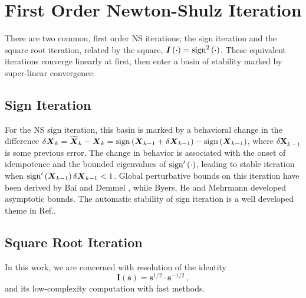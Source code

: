 \documentclass[letterpaper,twocolumn,amsmath,amsfont,amssymb,english,aps,jcp,preprintnumbers,groupaddress,nofootinbib,tightenlines,floatfix]{revtex4}
\newcommand{\mat}[1]{\boldsymbol{#1}}
\theoremstyle{plain}
\theoremstyle{remark}
\theoremstyle{plain}
\begin{document}

\section{First Order Newton-Shulz Iteration}

There are two common, first order NS iterations; the sign iteration
and the square root iteration, related by the square, $\mat{I}\left(
\cdot \right)= {\rm sign}^2\left( \cdot \right) $.  These equivalent
iterations converge linearly at first, then enter a basin of stability
marked by super-linear convergence.  

\subsection{Sign Iteration}

For the NS sign iteration, this basin is marked by a behavioral change
in the difference $\delta \mat{X}_k = \widetilde{\mat{X}}_k -\mat{X}_k
= {\rm sign} \left(\mat{X}_{k-1}+\delta \mat{X}_{k-1} \right) -{\rm
  sign} \left(\mat{X}_{k-1} \right)$, where $\delta \mat{X}_{k-1}$ is
some previous error.  The change in behavior is associated with the
onset of idempotence and the bounded eigenvalues of ${\rm sign}'\left(
\cdot \right)$, leading to stable iteration when ${\rm sign}'\left(
\mat{X}_{k-1} \right) \delta \mat{X}_{k-1} < 1 $.  Global perturbative
bounds on this iteration have been derived by Bai and Demmel
\cite{Bai98usingthe}, while Byers, He and Mehrmann \cite{} developed
asymptotic bounds.  The automatic stability of sign iteration is a
well developed theme in Ref.\cite{Higham08}.

\subsection{Square Root Iteration}

In this work, we are concerned with resolution of the identity \cite{}
\begin{equation}
\mat{I} \left( \mat{s} \right) =\mat{s}^{1/2} \cdot \mat{s}^{-1/2} \, ,
\end{equation}
and its low-complexity computation with fast methods.  
\end{document}
